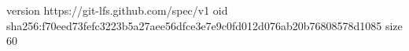 version https://git-lfs.github.com/spec/v1
oid sha256:f70eed73fefc3223b5a27aee56dfce3e7e9c0fd012d076ab20b76808578d1085
size 60
